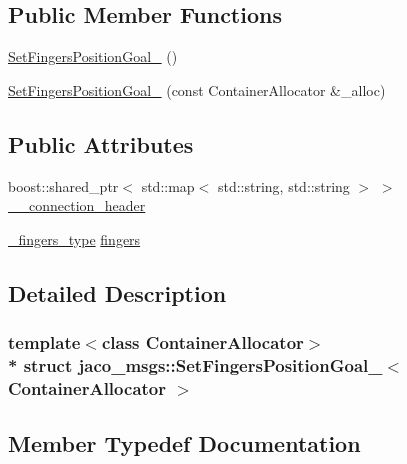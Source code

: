 \subsection*{Public Member Functions}
\begin{DoxyCompactItemize}
\item 
\hyperlink{structjaco__msgs_1_1SetFingersPositionGoal___a1bcd2b8da3fe9ee99dfe55275e34f677}{Set\+Fingers\+Position\+Goal\+\_\+} ()
\item 
\hyperlink{structjaco__msgs_1_1SetFingersPositionGoal___a9b846bc62923c98b7e59acb2ccdd8ca8}{Set\+Fingers\+Position\+Goal\+\_\+} (const Container\+Allocator \&\+\_\+alloc)
\end{DoxyCompactItemize}
\subsection*{Public Attributes}
\begin{DoxyCompactItemize}
\item 
boost\+::shared\+\_\+ptr$<$ std\+::map$<$ std\+::string, std\+::string $>$ $>$ \hyperlink{structjaco__msgs_1_1SetFingersPositionGoal___aba3041dd9942f01a26591f2687fdf752}{\+\_\+\+\_\+connection\+\_\+header}
\item 
\hyperlink{structjaco__msgs_1_1SetFingersPositionGoal___abb2ddc1ec460839d7bcbc60fec63f463}{\+\_\+fingers\+\_\+type} \hyperlink{structjaco__msgs_1_1SetFingersPositionGoal___a4dc54e46b1b6111db63125188a0d939e}{fingers}
\end{DoxyCompactItemize}


\subsection{Detailed Description}
\subsubsection*{template$<$class Container\+Allocator$>$\\*
struct jaco\+\_\+msgs\+::\+Set\+Fingers\+Position\+Goal\+\_\+$<$ Container\+Allocator $>$}



\subsection{Member Typedef Documentation}

